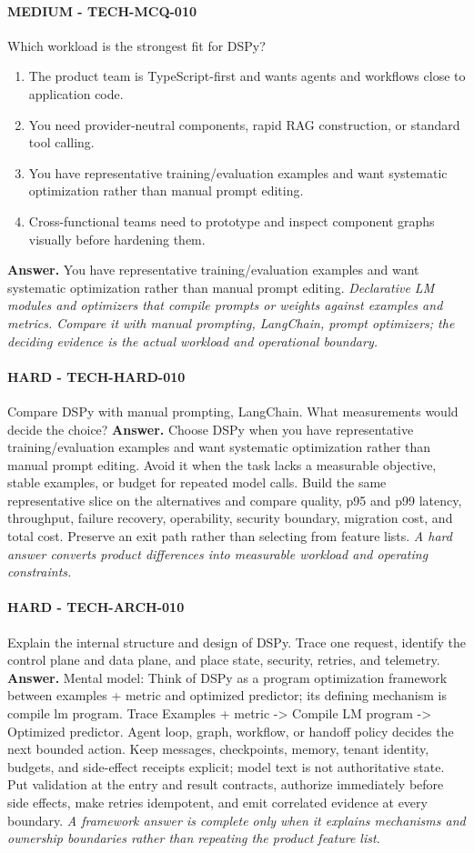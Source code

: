 \paragraph{MEDIUM - TECH-MCQ-010} Which workload is the strongest fit for DSPy?
\begin{enumerate}[label=\Alph*.]
\item The product team is TypeScript-first and wants agents and workflows close to application code.
\item You need provider-neutral components, rapid RAG construction, or standard tool calling.
\item You have representative training/evaluation examples and want systematic optimization rather than manual prompt editing.
\item Cross-functional teams need to prototype and inspect component graphs visually before hardening them.
\end{enumerate}
\textbf{Answer.} You have representative training/evaluation examples and want systematic optimization rather than manual prompt editing.
\textit{Declarative LM modules and optimizers that compile prompts or weights against examples and metrics. Compare it with manual prompting, LangChain, prompt optimizers; the deciding evidence is the actual workload and operational boundary.}
\paragraph{HARD - TECH-HARD-010} Compare DSPy with manual prompting, LangChain. What measurements would decide the choice?
\textbf{Answer.} Choose DSPy when you have representative training/evaluation examples and want systematic optimization rather than manual prompt editing. Avoid it when the task lacks a measurable objective, stable examples, or budget for repeated model calls. Build the same representative slice on the alternatives and compare quality, p95 and p99 latency, throughput, failure recovery, operability, security boundary, migration cost, and total cost. Preserve an exit path rather than selecting from feature lists.
\textit{A hard answer converts product differences into measurable workload and operating constraints.}
\paragraph{HARD - TECH-ARCH-010} Explain the internal structure and design of DSPy. Trace one request, identify the control plane and data plane, and place state, security, retries, and telemetry.
\textbf{Answer.} Mental model: Think of DSPy as a program optimization framework between examples + metric and optimized predictor; its defining mechanism is compile lm program. Trace Examples + metric -> Compile LM program -> Optimized predictor. Agent loop, graph, workflow, or handoff policy decides the next bounded action. Keep messages, checkpoints, memory, tenant identity, budgets, and side-effect receipts explicit; model text is not authoritative state. Put validation at the entry and result contracts, authorize immediately before side effects, make retries idempotent, and emit correlated evidence at every boundary.
\textit{A framework answer is complete only when it explains mechanisms and ownership boundaries rather than repeating the product feature list.}
